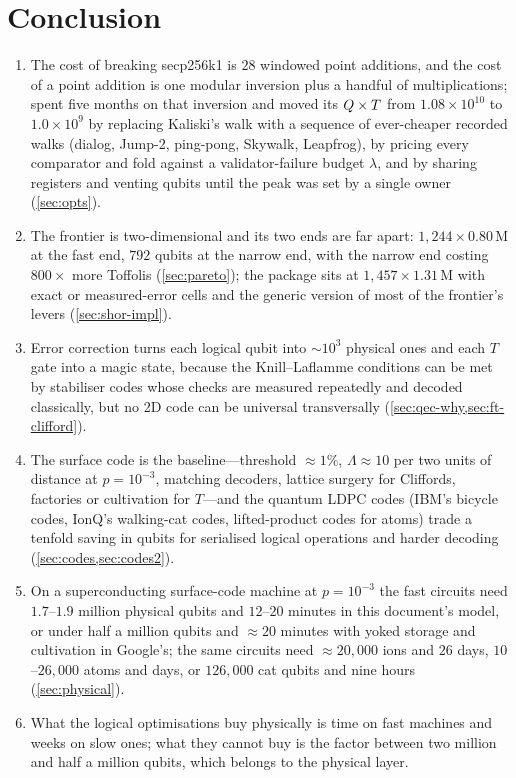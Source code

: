 \section{Conclusion}\label{sec:conclusion}

\begin{keybox}[title={The whole picture in six statements}]
\begin{enumerate}[leftmargin=*,itemsep=2pt]
\item The cost of breaking secp256k1 is $28$ windowed point additions, and the cost of a point addition is one modular inversion plus a handful of multiplications; \ecdsafail{} spent five months on that inversion and moved its $Q\times T$ from $1.08\times10^{10}$ to $1.0\times10^9$ by replacing Kaliski's walk with a sequence of ever-cheaper recorded walks (dialog, Jump-2, ping-pong, Skywalk, Leapfrog), by pricing every comparator and fold against a validator-failure budget $\lambda$, and by sharing registers and venting qubits until the peak was set by a single owner (\cref{sec:opts}).
\item The frontier is two-dimensional and its two ends are far apart: $1{,}244\times0.80$\,M at the fast end, $792$ qubits at the narrow end, with the narrow end costing $800\times$ more Toffolis (\cref{sec:pareto}); the  package sits at $1{,}457\times1.31$\,M with exact or measured-error cells and the generic version of most of the frontier's levers (\cref{sec:shor-impl}).
\item Error correction turns each logical qubit into $\sim10^3$ physical ones and each $T$ gate into a magic state, because the Knill--Laflamme conditions can be met by stabiliser codes whose checks are measured repeatedly and decoded classically, but no 2D code can be universal transversally (\cref{sec:qec-why,sec:ft-clifford}).
\item The surface code is the baseline---threshold $\approx1\%$, $\Lambda\approx10$ per two units of distance at $p=10^{-3}$, matching decoders, lattice surgery for Cliffords, factories or cultivation for $T$---and the quantum LDPC codes (IBM's bicycle codes, IonQ's walking-cat codes, lifted-product codes for atoms) trade a tenfold saving in qubits for serialised logical operations and harder decoding (\cref{sec:codes,sec:codes2}).
\item On a superconducting surface-code machine at $p=10^{-3}$ the fast \ecdsafail{} circuits need $1.7$--$1.9$ million physical qubits and $12$--$20$ minutes in this document's model, or under half a million qubits and $\approx20$ minutes with yoked storage and cultivation in Google's; the same circuits need $\approx20{,}000$ ions and $26$ days, $10$--$26{,}000$ atoms and days, or $126{,}000$ cat qubits and nine hours (\cref{sec:physical}).
\item What the logical optimisations buy physically is time on fast machines and weeks on slow ones; what they cannot buy is the factor between two million and half a million qubits, which belongs to the physical layer.
\end{enumerate}
\end{keybox}

